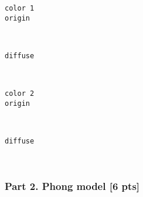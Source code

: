 \documentclass[11pt]{article}
\begin{document}
    \begin{Verbatim}[commandchars=\\\{\}]
color 1
origin

    \end{Verbatim}

    \begin{center}
    \end{center}
    { \hspace*{\fill} \\}
    
    \begin{Verbatim}[commandchars=\\\{\}]
diffuse

    \end{Verbatim}

    \begin{center}
    \end{center}
    { \hspace*{\fill} \\}
    
    \begin{Verbatim}[commandchars=\\\{\}]
color 2
origin

    \end{Verbatim}

    \begin{center}
    \end{center}
    { \hspace*{\fill} \\}
    
    \begin{Verbatim}[commandchars=\\\{\}]
diffuse

    \end{Verbatim}

    \begin{center}
    \end{center}
    { \hspace*{\fill} \\}
    
    \hypertarget{part-2.-phong-model-6-pts}{%
\subsubsection{Part 2. Phong model {[}6
pts{]}}\label{part-2.-phong-model-6-pts}}
\end{document}
